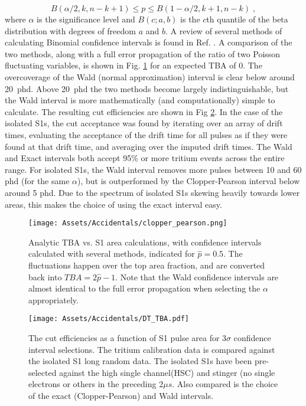 \begin{equation}
    B(\alpha/2, k, n-k+1) \leq p \leq B(1- \alpha/2,k+1, n-k)\;,
\end{equation}
\noindent
where $\alpha$ is the significance level and $B(c;a,b)$ is the $c$th quantile of the beta distribution with degrees of freedom $a$ and $b$.
A review of several methods of calculating Binomial confidence intervals is found in Ref. \cite{sakakibara_comparison_2014}.
A comparison of the two methods, along with a full error propagation of the ratio of two Poisson fluctuating variables, is shown in Fig. \ref{fig:clopper_pearson} for an expected TBA of 0.
The overcoverage of the Wald (normal approximation) interval is clear below around 20~phd.
Above 20~phd the two methods become largely indistinguishable, but the Wald interval is more mathematically (and computationally) simple to calculate.
The resulting cut efficiencies are shown in Fig \ref{fig:tba_dt_intervals}.
In the case of the isolated S1s, the cut acceptance was found by iterating over an array of drift times, evaluating the acceptance of the drift time for all pulses as if they were found at that drift time, and averaging over the imputed drift times.
The Wald and Exact intervals both accept 95\% or more tritium events across the entire range.
For isolated S1s, the Wald interval removes more pulses between 10 and 60 phd (for the same $\alpha$), but is outperformed by the Clopper-Pearson interval below around 5 phd.
Due to the spectrum of isolated S1s skewing heavily towards lower areas, this makes the choice of using the exact interval easy.

\begin{figure}
    \centering
    \texttt{[image: Assets/Accidentals/clopper\_pearson.png]}
    \caption[Analytic TBA vs. S1 area calculations, with confidence intervals calculated with several methods, indicated for $\hat{p}=0.5$. ]%
    {Analytic TBA vs. S1 area calculations, with confidence intervals calculated with several methods, indicated for $\hat{p}=0.5$. 
    The fluctuations happen over the top area fraction, and are converted back into $TBA= 2\hat{p}-1$.
    Note that the Wald confidence intervals are almost identical to the full error propagation when selecting the $\alpha$ appropriately.}
    \label{fig:clopper_pearson}
\end{figure}
\begin{figure}
    \centering
    \texttt{[image: Assets/Accidentals/DT\_TBA.pdf]}
    \caption[The TBA-drift time cut efficiencies as a function of S1 pulse area for 3$\sigma$ confidence interval selections.]%
    {The cut efficiencies as a function of S1 pulse area for 3$\sigma$ confidence interval selections.
    The tritium calibration data is compared against the isolated S1 long random data.
    The isolated S1s have been pre-selected against the high single channel(HSC) and stinger (no single electrons or others in the preceding 2$\mu s$.
    Also compared is the choice of the exact (Clopper-Pearson) and Wald intervals.}
    \label{fig:tba_dt_intervals}
\end{figure}

